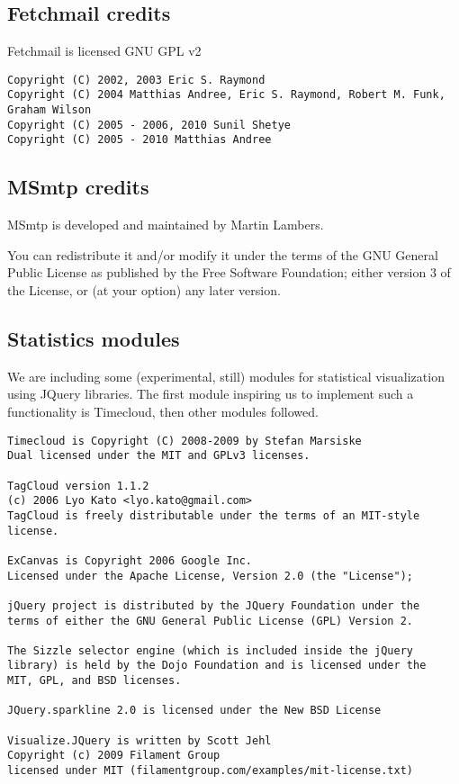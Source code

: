 \documentclass[a4,onecolumn,portrait]{article}
\begin{document}
\subsection{Fetchmail credits}
\label{sec-12-5}

Fetchmail is licensed GNU GPL v2

\begin{verbatim}
Copyright (C) 2002, 2003 Eric S. Raymond
Copyright (C) 2004 Matthias Andree, Eric S. Raymond, Robert M. Funk, Graham Wilson
Copyright (C) 2005 - 2006, 2010 Sunil Shetye
Copyright (C) 2005 - 2010 Matthias Andree
\end{verbatim}
\subsection{MSmtp credits}
\label{sec-12-6}

MSmtp is developed and maintained by Martin Lambers.

You can redistribute it and/or modify it under the terms of the GNU
General Public License as published by the Free Software Foundation;
either version 3 of the License, or (at your option) any later
version.
\subsection{Statistics modules}
\label{sec-12-7}
We are including some (experimental, still) modules for statistical
visualization using JQuery libraries. The first module inspiring us
to implement such a functionality is Timecloud, then other modules
followed.

\begin{verbatim}
Timecloud is Copyright (C) 2008-2009 by Stefan Marsiske
Dual licensed under the MIT and GPLv3 licenses.

TagCloud version 1.1.2
(c) 2006 Lyo Kato <lyo.kato@gmail.com>
TagCloud is freely distributable under the terms of an MIT-style license.

ExCanvas is Copyright 2006 Google Inc.
Licensed under the Apache License, Version 2.0 (the "License");

jQuery project is distributed by the JQuery Foundation under the
terms of either the GNU General Public License (GPL) Version 2.

The Sizzle selector engine (which is included inside the jQuery
library) is held by the Dojo Foundation and is licensed under the
MIT, GPL, and BSD licenses.

JQuery.sparkline 2.0 is licensed under the New BSD License

Visualize.JQuery is written by Scott Jehl
Copyright (c) 2009 Filament Group
licensed under MIT (filamentgroup.com/examples/mit-license.txt)
\end{verbatim}
\end{document}
